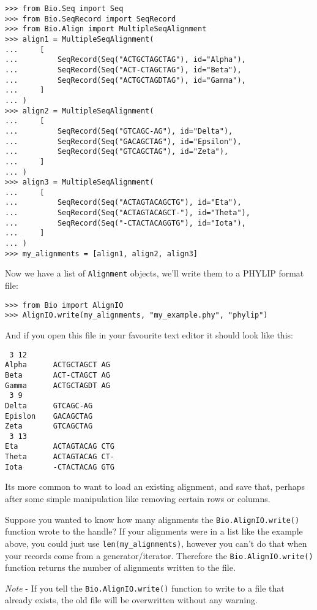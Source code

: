 \begin{verbatim}
>>> from Bio.Seq import Seq
>>> from Bio.SeqRecord import SeqRecord
>>> from Bio.Align import MultipleSeqAlignment
>>> align1 = MultipleSeqAlignment(
...     [
...         SeqRecord(Seq("ACTGCTAGCTAG"), id="Alpha"),
...         SeqRecord(Seq("ACT-CTAGCTAG"), id="Beta"),
...         SeqRecord(Seq("ACTGCTAGDTAG"), id="Gamma"),
...     ]
... )
>>> align2 = MultipleSeqAlignment(
...     [
...         SeqRecord(Seq("GTCAGC-AG"), id="Delta"),
...         SeqRecord(Seq("GACAGCTAG"), id="Epsilon"),
...         SeqRecord(Seq("GTCAGCTAG"), id="Zeta"),
...     ]
... )
>>> align3 = MultipleSeqAlignment(
...     [
...         SeqRecord(Seq("ACTAGTACAGCTG"), id="Eta"),
...         SeqRecord(Seq("ACTAGTACAGCT-"), id="Theta"),
...         SeqRecord(Seq("-CTACTACAGGTG"), id="Iota"),
...     ]
... )
>>> my_alignments = [align1, align2, align3]
\end{verbatim}

\noindent Now we have a list of \verb|Alignment| objects, we'll write them to a PHYLIP format file:

\begin{verbatim}
>>> from Bio import AlignIO
>>> AlignIO.write(my_alignments, "my_example.phy", "phylip")
\end{verbatim}

\noindent And if you open this file in your favourite text editor it should look like this:

\begin{verbatim}
 3 12
Alpha      ACTGCTAGCT AG
Beta       ACT-CTAGCT AG
Gamma      ACTGCTAGDT AG
 3 9
Delta      GTCAGC-AG
Epislon    GACAGCTAG
Zeta       GTCAGCTAG
 3 13
Eta        ACTAGTACAG CTG
Theta      ACTAGTACAG CT-
Iota       -CTACTACAG GTG
\end{verbatim}

Its more common to want to load an existing alignment, and save that, perhaps after some simple manipulation like removing certain rows or columns.

Suppose you wanted to know how many alignments the \verb|Bio.AlignIO.write()| function wrote to the handle? If your alignments were in a list like the example above, you could just use \verb|len(my_alignments)|, however you can't do that when your records come from a generator/iterator.  Therefore the \verb|Bio.AlignIO.write()| function returns the number of alignments written to the file.

\emph{Note} - If you tell the \verb|Bio.AlignIO.write()| function to write to a file that already exists, the old file will be overwritten without any warning.


